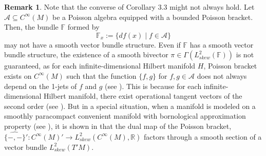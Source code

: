 \documentclass[11pt,reqno]{amsart}
\theoremstyle{definition}
\newtheorem{remark}[theorem]{Remark}
\numberwithin{equation}{section}
\begin{document}
 \begin{remark}  
Note that the converse of Corollary 3.3  might not always hold. Let $\mathcal A\subseteq C^\infty( M)$ be a Poisson algebra equipped with a bounded Poisson bracket. Then, the bundle $\mathbb F$ formed by \[ \mathbb{F}_x := \{df(x) \mid f \in \mathcal{A} \}\] may not have a smooth vector bundle structure. Even if $\mathbb F$ has a smooth vector bundle structure, the existence of a smooth bivector $\pi \in \Gamma(L^2_{skew}(\mathbb F))$ is not guaranteed, as for each infinite-dimensional Hilbert manifold $H$, Poisson bracket exists on $C^\infty(M)$ such that the function $\{f,g\}$ for $f,g \in \mathcal A$ does not always depend on the 1-jets of $f$ and $g$ (see \cite{38}). This is because for each infinite-dimensional Hilbert manifold, there exist operational tangent vectors of the second order (see \cite[Remark 28.8]{20}). But in a special situation, when a manifold is modeled on a smoothly paracompact convenient manifold with bornological approximation property (see \cite[6.6]{20}), it is shown in \cite{39} that the dual map of the Poisson bracket, $\widehat{\{-,-\}}':C^\infty(M)'\rightarrow{} L^2_{skew}(C^\infty(M),\mathbb R)$ factors through a smooth section of a vector bundle $L^2_{skew}(T'M)$.
\end{remark}
\end{document}
